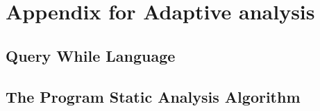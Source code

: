 \chapter{Appendix for Adaptive analysis }
\label{AppC}


% 
\section{Query While Language}
\label{appendix:adapt:language}

\clearpage


\section{The Program Static Analysis Algorithm}
\label{appendix:adapt:adaptfun}




